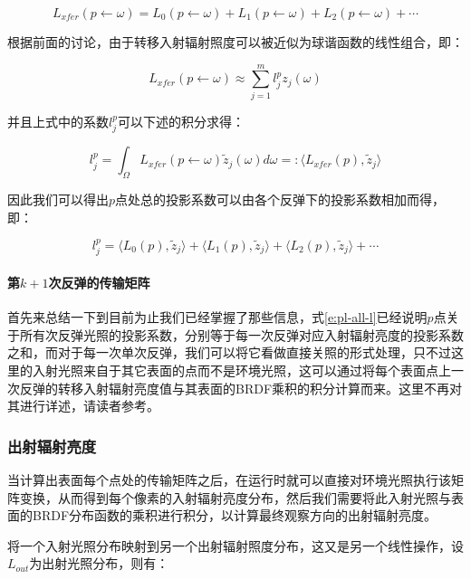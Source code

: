 \begin{equation}
	L_{xfer}(p\leftarrow\omega)=L_{0}(p\leftarrow\omega)+L_{1}(p\leftarrow\omega)+L_{2}(p\leftarrow\omega)+\cdots
\end{equation}

根据前面的讨论，由于转移入射辐射照度可以被近似为球谐函数的线性组合，即：

\begin{equation}
	L_{xfer}(p\leftarrow\omega)\approx\sum^{m}_{j=1}l^{p}_jz_j(\omega)
\end{equation}

\noindent 并且上式中的系数$l^{p}_j$可以下述的积分求得：

\begin{equation}
	l_j^{p}=\int_\Omega L_{xfer}(p\leftarrow\omega)\tilde{z}_j(\omega)d\omega=:\langle L_{xfer}(p),\tilde{z}_j\rangle
\end{equation}


\noindent 因此我们可以得出$p$点处总的投影系数可以由各个反弹下的投影系数相加而得，即：

\begin{equation}\label{e:pl-all-l}
	l^{p}_j=\langle L_0(p),\tilde{z}_j\rangle+\langle L_1(p),\tilde{z}_j\rangle+\langle L_2(p),\tilde{z}_j\rangle+\cdots
\end{equation}



\paragraph{第$k+1$次反弹的传输矩阵}
首先来总结一下到目前为止我们已经掌握了那些信息，式\ref{e:pl-all-l}已经说明$p$点关于所有次反弹光照的投影系数，分别等于每一次反弹对应入射辐射亮度的投影系数之和，而对于每一次单次反弹，我们可以将它看做直接关照的形式处理，只不过这里的入射光照来自于其它表面的点而不是环境光照，这可以通过将每个表面点上一次反弹的转移入射辐射亮度值与其表面的BRDF乘积的积分计算而来。这里不再对其进行详述，请读者参考\cite{a:PrecomputedRadianceTransfer:TheoryandPractice}。




\subsubsection{出射辐射亮度}
当计算出表面每个点处的传输矩阵之后，在运行时就可以直接对环境光照执行该矩阵变换，从而得到每个像素的入射辐射亮度分布，然后我们需要将此入射光照与表面的BRDF分布函数的乘积进行积分，以计算最终观察方向的出射辐射亮度。

将一个入射光照分布映射到另一个出射辐射照度分布，这又是另一个线性操作，设$L_{out}$为出射光照分布，则有：

